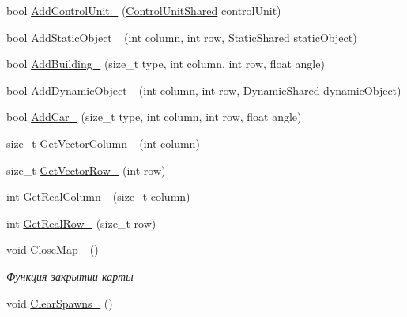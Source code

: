 \begin{DoxyCompactItemize}
\item 
bool \hyperlink{classrtm_1_1_world_controller_a54a03012a522c844563f092e4f0a1e60}{Add\+Control\+Unit\+\_\+} (\hyperlink{namespacertm_a64296d558b2fa02bbf5870afffd61fd9}{Control\+Unit\+Shared} control\+Unit)
\item 
bool \hyperlink{classrtm_1_1_world_controller_a07bb2d2043361ea1768cc157a19c472d}{Add\+Static\+Object\+\_\+} (int column, int row, \hyperlink{namespacertm_a80e2b49f975d8e515a73b3b579b88e07}{Static\+Shared} static\+Object)
\item 
bool \hyperlink{classrtm_1_1_world_controller_ae17e4ffc602819f5b382251b501b1d7c}{Add\+Building\+\_\+} (size\+\_\+t type, int column, int row, float angle)
\item 
bool \hyperlink{classrtm_1_1_world_controller_aa886cfea79318d25b2ab69b01c01a5a3}{Add\+Dynamic\+Object\+\_\+} (int column, int row, \hyperlink{namespacertm_af668a936c29b476890a79ad1eb19e3cc}{Dynamic\+Shared} dynamic\+Object)
\item 
bool \hyperlink{classrtm_1_1_world_controller_add7f36a79e7f096c8cf1d7413affec6a}{Add\+Car\+\_\+} (size\+\_\+t type, int column, int row, float angle)
\item 
size\+\_\+t \hyperlink{classrtm_1_1_world_controller_ab88f97b038e03e763c6f863cf38863fb}{Get\+Vector\+Column\+\_\+} (int column)
\item 
size\+\_\+t \hyperlink{classrtm_1_1_world_controller_a294d87950964a203d2b7cc7fb7716168}{Get\+Vector\+Row\+\_\+} (int row)
\item 
int \hyperlink{classrtm_1_1_world_controller_a73f4df1b8493c6d6d0a6b3cdb21a076c}{Get\+Real\+Column\+\_\+} (size\+\_\+t column)
\item 
int \hyperlink{classrtm_1_1_world_controller_a3aad7b071f3e8a80ab159e89ec5c8035}{Get\+Real\+Row\+\_\+} (size\+\_\+t row)
\item 
\mbox{\label{classrtm_1_1_world_controller_a3cd1dce633aa3d4a6991ccf6c367b9a8}} 
void \hyperlink{classrtm_1_1_world_controller_a3cd1dce633aa3d4a6991ccf6c367b9a8}{Close\+Map\+\_\+} ()
\begin{DoxyCompactList}\small\item\em Функция закрытии карты \end{DoxyCompactList}\item 
\mbox{\label{classrtm_1_1_world_controller_a01b62499764622bf0e08e17456ca3550}} 
void \hyperlink{classrtm_1_1_world_controller_a01b62499764622bf0e08e17456ca3550}{Clear\+Spawns\+\_\+} ()

\end{DoxyCompactItemize}
